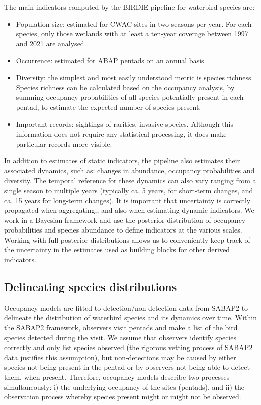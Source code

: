 \documentclass[utf8]{frontiersSCNS}
\begin{document}
The main indicators computed by the BIRDIE pipeline for waterbird
species are:

\begin{itemize}
\item
  Population size: estimated for CWAC sites in two seasons per year. For
  each species, only those wetlands with at least a ten-year coverage
  between 1997 and 2021 are analysed.
\item
  Occurrence: estimated for ABAP pentads on an annual basis.
\item
  Diversity: the simplest and most easily understood metric is species
  richness. Species richness can be calculated based on the occupancy
  analysis, by summing occupancy probabilities of all species
  potentially present in each pentad, to estimate the expected number of
  species present.
\item
  Important records: sightings of rarities, invasive species. Although
  this information does not require any statistical processing, it does
  make particular records more visible.
\end{itemize}

In addition to estimates of static indicators, the pipeline also
estimates their associated dynamics, such as: changes in abundance,
occupancy probabilities and diversity. The temporal reference for these
dynamics can also vary ranging from a single season to multiple years
(typically ca. 5 years, for short-term changes, and ca. 15 years for
long-term changes). It is important that uncertainty is correctly
propagated when aggregating,, and also when estimating dynamic
indicators. We work in a Bayesian framework and use the posterior
distribution of occupancy probabilities and species abundance to define
indicators at the various scales. Working with full posterior
distributions allows us to conveniently keep track of the uncertainty in
the estimates used as building blocks for other derived indicators.

\hypertarget{delineating-species-distributions}{%
\subsection*{Delineating species
distributions}\label{delineating-species-distributions}}

Occupancy models are fitted to detection/non-detection data from SABAP2
to delineate the distribution of waterbird species and its dynamics over
time. Within the SABAP2 framework, observers visit pentads and make a
list of the bird species detected during the visit. We assume that
observers identify species correctly and only list species observed (the
rigorous vetting process of SABAP2 data justifies this assumption), but
non-detections may be caused by either species not being present in the
pentad or by observers not being able to detect them, when present.
Therefore, occupancy models describe two processes simultaneously: i)
the underlying occupancy of the sites (pentads), and ii) the observation
process whereby species present might or might not be observed.
\end{document}

